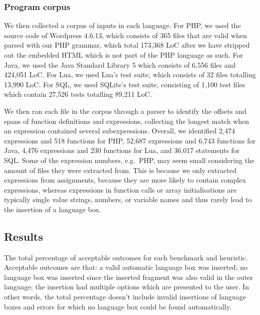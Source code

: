 \documentclass[sigplan,screen]{acmart}\settopmatter{printfolios=true,printccs=false,printacmref=false}
\begin{document}
\subsubsection{Program corpus}

We then collected a corpus of inputs in each language.
For PHP, we used the source code of Wordpress 4.6.13, which consists of 365 files that are
valid when parsed with our PHP grammar, which total 173,368 LoC after we
have stripped out the embedded HTML which is not part of the PHP
language as such. For Java, we used the Java Standard Library 5 which consists
of 6,556 files and 424,051 LoC.
For Lua, we used Lua's test suite, which consists of 32 files totalling 13,990 LoC.
For SQL, we used SQLite's test suite, consisting of 1,100 test files which
contain 27,526 tests totalling 89,211 LoC.

We then ran each file in the corpus through a parser to identify the offsets and spans
of function definitions and expressions, collecting the longest match when an
expression contained several subexpressions. Overall, we identified 2,474
expressions and 518 functions for PHP, 52,687 expressions and 6,743 functions for
Java, 4,476 expressions and 230 functions for Lua, and 36,017 statements for SQL.
Some of the expression numbers, e.g.~PHP, may seem small considering the amount
of files they were extracted from. This is because we only extracted
expressions from assignments, because they are more likely to contain complex
expressions, whereas expressions in function calls or array initialisations are
typically single value strings, numbers, or variable names and thus rarely lead
to the insertion of a language box.


\subsection{Results}

\begin{table}[tb]
    

    \vspace{7pt}
    \caption{The total percentage of acceptable outcomes for each benchmark and
    heuristic. Acceptable outcomes are that: a valid automatic language box
    was inserted; no language box was inserted since the inserted fragment
    was also valid in the outer language; the insertion had multiple options
    which are presented to the user. In other words, the total percentage
    doesn't include invalid insertions of language boxes and errors for which
    no language box could be found automatically.}
    \label{tbl:valid}
\end{table}
\end{document}
